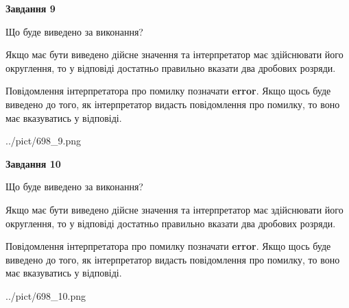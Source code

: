 \documentclass[12pt, ukrainian]{article}
\begin{document}
{\begin {Large}
{\begin {center}\textbf{Завдання 9}\end {center}}\par
Що буде виведено за виконання? \par

Якщо має бути виведено дійсне значення та інтерпретатор має здійснювати його округлення, 
то у відповіді достатньо правильно вказати два дробових розряди.

Повідомлення інтерпретатора про помилку позначати \textbf{error}.
Якщо щось буде виведено до того, як інтерпретатор видасть повідомлення про помилку, 
то воно має вказуватись у відповіді. \par

\begin{center}
	{../pict/698_9.png}
\end{center}
\newpage

{\begin {center}\textbf{Завдання 10}\end {center}}\par
Що буде виведено за виконання? \par

Якщо має бути виведено дійсне значення та інтерпретатор має здійснювати його округлення, 
то у відповіді достатньо правильно вказати два дробових розряди.

Повідомлення інтерпретатора про помилку позначати \textbf{error}.
Якщо щось буде виведено до того, як інтерпретатор видасть повідомлення про помилку, 
то воно має вказуватись у відповіді. \par

\begin{center}
	{../pict/698_10.png}
\end{center}
\newpage

\end {Large}}
\end{document}
